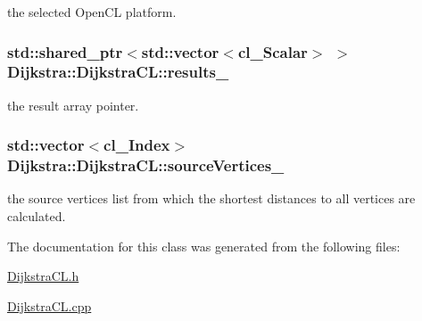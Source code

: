 the selected Open\+C\+L platform. 

\hypertarget{class_dijkstra_1_1_dijkstra_c_l_a51a092b08954b8a30b90514f86520b03}{
\subsubsection[{results\+\_\+}]{\setlength{\rightskip}{0pt plus 5cm}std\+::shared\+\_\+ptr$<$std\+::vector$<${\bf cl\+\_\+\+Scalar}$>$ $>$ Dijkstra\+::\+Dijkstra\+C\+L\+::results\+\_\+\hspace{0.3cm}{\ttfamily [private]}}}\label{class_dijkstra_1_1_dijkstra_c_l_a51a092b08954b8a30b90514f86520b03}


the result array pointer. 

\hypertarget{class_dijkstra_1_1_dijkstra_c_l_ae0327784ad33bc8cbd5c2c47e067d178}{
\subsubsection[{source\+Vertices\+\_\+}]{\setlength{\rightskip}{0pt plus 5cm}std\+::vector$<${\bf cl\+\_\+\+Index}$>$ Dijkstra\+::\+Dijkstra\+C\+L\+::source\+Vertices\+\_\+\hspace{0.3cm}{\ttfamily [private]}}}\label{class_dijkstra_1_1_dijkstra_c_l_ae0327784ad33bc8cbd5c2c47e067d178}


the source vertices list from which the shortest distances to all vertices are calculated. 



The documentation for this class was generated from the following files\+:\begin{DoxyCompactItemize}
\item 
\hyperlink{_dijkstra_c_l_8h}{Dijkstra\+C\+L.\+h}\item 
\hyperlink{_dijkstra_c_l_8cpp}{Dijkstra\+C\+L.\+cpp}\end{DoxyCompactItemize}
